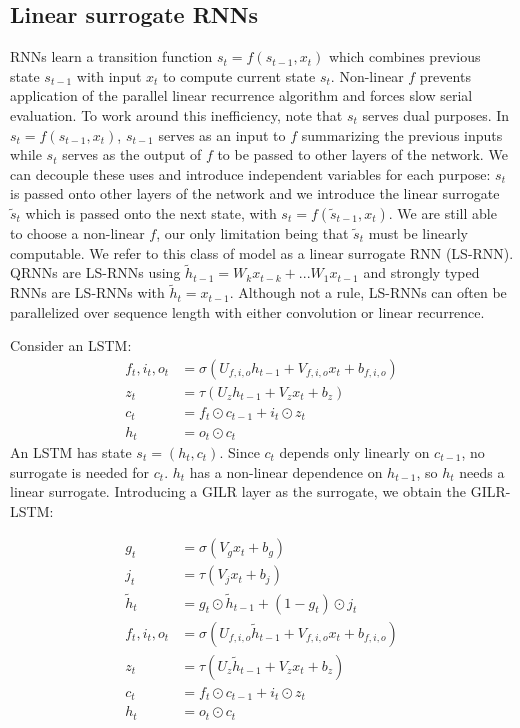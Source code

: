 \documentclass{article}
\begin{document}
\subsection{Linear surrogate RNNs}
\label{sec:ls-rnns}
RNNs learn a transition function $s_t = f(s_{t-1}, x_t)$ which combines previous
state $s_{t-1}$ with input $x_t$ to compute current state $s_t$. Non-linear $f$
prevents application of the parallel linear recurrence algorithm and forces slow
serial evaluation. To work around this inefficiency, note that $s_t$ serves
dual purposes. In $s_t = f(s_{t-1}, x_t)$, $s_{t-1}$ serves as an input to $f$
summarizing the previous inputs while $s_t$ serves as the output of $f$ to be
passed to other layers of the network. We can decouple these uses and introduce
independent variables for each purpose: \(s_t\) is passed onto other layers of the network
and we introduce the linear surrogate \(\tilde{s}_t\) which is passed onto the
next state, with \(s_t = f(\tilde{s}_{t-1}, x_t)\). We are still able to choose a
non-linear \(f\), our only limitation being that \(\tilde{s}_t\) must be linearly
computable.  We refer to this class of model as a linear surrogate RNN
(LS-RNN). QRNNs \citep{bradbury2017quasi} are LS-RNNs using $\tilde{h}_{t-1}
= W_k x_{t-k} + ... W_1 x_{t-1}$ and strongly typed
RNNs \citep{balduzzi2016strongly} are LS-RNNs with $\tilde{h}_t=x_{t-1}$. Although
not a rule, LS-RNNs can often be parallelized over sequence length with either
convolution or linear recurrence.

Consider an LSTM:
\begin{align*}
  f_t, i_t, o_t &= \sigma(U_{f,i,o} h_{t-1} + V_{f,i,o} x_t + b_{f,i,o}) \\
  z_t &= \tau(U_z h_{t-1} + V_z x_t + b_z) \\
  c_t &= f_t \odot c_{t-1} + i_t \odot z_t \\
  h_t &= o_t \odot c_t
\end{align*}
An LSTM has state $s_t = (h_t, c_t)$. Since $c_t$ depends only
linearly on $c_{t-1}$, no surrogate is needed for $c_t$. $h_t$ has a non-linear
dependence on $h_{t-1}$, so $h_t$ needs a linear surrogate. Introducing a GILR layer as
the surrogate, we obtain the GILR-LSTM:

\begin{align*}
  g_t &= \sigma(V_g x_t + b_g) \\
  j_t &= \tau(V_j x_t + b_j) \\
  \tilde{h}_t &= g_t \odot \tilde{h}_{t-1} + (1-g_t)\odot j_t \\
  f_t, i_t, o_t &= \sigma(U_{f,i,o} \tilde{h}_{t-1} + V_{f,i,o} x_t + b_{f,i,o}) \\
  z_t &= \tau(U_z \tilde{h}_{t-1} + V_z x_t + b_z) \\
  c_t &= f_t \odot c_{t-1} + i_t \odot z_t \\
  h_t &= o_t \odot c_t \\
\end{align*}
\end{document}
